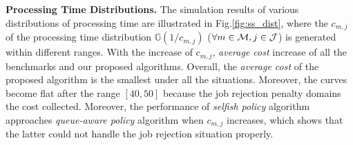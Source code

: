 \textbf{Processing Time Distributions.}
The simulation results of various distributions of processing time are illustrated in Fig.\ref{fig:ss_dist}, where the $c_{m,j}$ of the processing time distribution $\mathbb{G}(1/c_{m,j})$ ($\forall m\in\mathcal{M},j\in\mathcal{J}$) is generated within different ranges.
With the increase of $c_{m,j}$, \emph{average cost} increase of all the benchmarks and our proposed algorithms.
Overall, the \emph{average cost} of the proposed algorithm is the smallest under all the situations.
Moreover, the curves become flat after the range $[40,50]$ because the job rejection penalty domains the cost collected.
Moreover, the performance of \emph{selfish policy} algorithm approaches \emph{queue-aware policy} algorithm when $c_{m,j}$ increases, which shows that the latter could not handle the job rejection situation properly.


